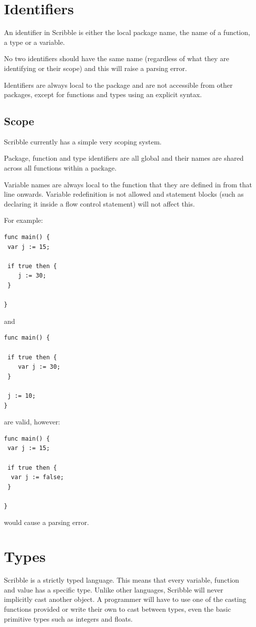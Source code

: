 \documentclass[]{final_report}
\begin{document}
\section{Identifiers}

An identifier in Scribble is either the local package name, the name of a function, a type or a variable.

No two identifiers should have the same name (regardless of what they are identifying or their scope) and this will raise a parsing error.

Identifiers are always local to the package and are not accessible from other packages, except for functions and types using an explicit syntax.

\subsection{Scope}

Scribble currently has a simple very scoping system.

Package, function and type identifiers are all global and their names are shared across all functions within a package.

Variable names are always local to the function that they are defined in from that line onwards. Variable redefinition is not allowed and statement blocks (such as declaring it inside a flow control statement) will not affect this.

For example:
\begin{verbatim}
func main() {
 var j := 15;
 
 if true then {
 	j := 30;
 }

}
\end{verbatim}
and
\begin{verbatim}
func main() {
 
 if true then {
 	var j := 30;
 }
 
 j := 10;
}
\end{verbatim}
are valid, however:
\begin{verbatim}
func main() {
 var j := 15;
 
 if true then { 
  var j := false; 
 }

}
\end{verbatim}
would cause a parsing error.

\section{Types}

Scribble is a strictly typed language. This means that every variable, function and value has a specific type. Unlike other languages, Scribble will never implicitly cast another object. A programmer will have to use one of the casting functions provided or write their own to cast between types, even the basic primitive types such as integers and floats.
\end{document}
